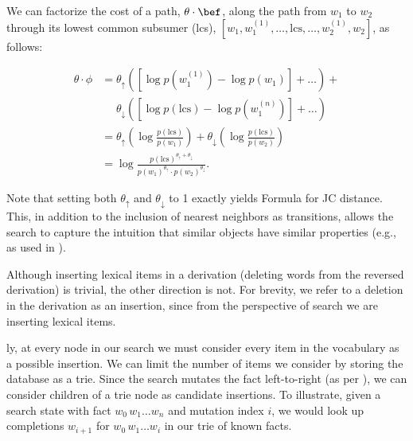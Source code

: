 We can factorize the cost of a path, $\theta \cdot \bef$, along the path
  from $w_1$ to $w_2$ through its lowest common subsumer (lcs),
  $[w_1, w_1^{(1)}, \dots, \textrm{lcs}, \dots,  w_2^{(1)}, w_2]$,
  as follows:

\vspace{-0.5em}
\begin{align*}
\theta \cdot \phi
  &= \theta_\uparrow \left( 
    \left[\log p(w_1^{(1)}) - \log p(w_1)\right] +
    \dots
    \right) + \\
  &~~~~~~ \theta_\downarrow \left( 
    \left[\log p(\textrm{lcs}) - \log p(w_1^{(n)}) \right] +
    \dots
    \right) \\
  &= \theta_\uparrow \left( \log \frac{p(\textrm{lcs})}{p(w_1)} \right) +
     \theta_\downarrow \left( \log \frac{p(\textrm{lcs})}{p(w_2)} \right) \\
  &= \log \frac{ p(\textrm{lcs})^{\theta_\uparrow + \theta_\downarrow} }
               { p(w_1)^{\theta_\uparrow} \cdot p(w_2)^{\theta_\downarrow} }.
\end{align*}
\vspace{-0.5em}

Note that setting both $\theta_\uparrow$ and $\theta_\downarrow$ to 1 exactly
  yields Formula  for JC distance.
This, in addition to the inclusion of nearest neighbors as transitions,
  allows the search to capture the intuition that similar objects
  have similar properties
  (e.g., as used in ).
%


%
%
Although inserting lexical items in a derivation (deleting words from
  the reversed derivation) is trivial, the other direction is not.
For brevity, we refer to a deletion in the derivation as an insertion,
  since from the perspective of search we are inserting lexical items.

\Naive ly, at every node in our search we must consider every item in
  the vocabulary as a possible insertion.
We can limit the number of items we consider by storing the database
  as a trie.
Since the search mutates the fact left-to-right 
  (as per ), we can
  consider children of a trie node as candidate insertions.
To illustrate, given a search state with fact $w_0\,w_1 \dots w_n$
  and mutation index $i$, we would look up completions $w_{i+1}$ for
  $w_0\,w_1 \dots w_i$ in our trie of known facts.


